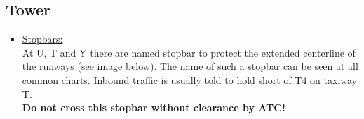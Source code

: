 \subsection[tower]{Tower}

\begin{itemize}
  \item \underline{Stopbars:}\\ 
    At U, T and Y there are named stopbar to protect the extended centerline of the runways (see image below). 
    The name of such a stopbar can be seen at all common charts. 
    Inbound traffic is usually told to hold short of T4 on taxiway T.\\ 
    \textbf{Do not cross this stopbar without clearance by ATC!}
    
    
\end{itemize}
